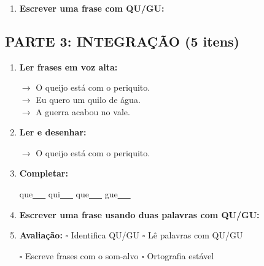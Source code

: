 \begin{exercicio}
\begin{enumerate}[resume]
  \item \textbf{Escrever uma frase com QU/GU:}
  \begin{center}
  \underline{\hspace{12cm}}
  \end{center}

\end{enumerate}

\subsection*{PARTE 3: INTEGRAÇÃO (5 itens)}

\begin{enumerate}[resume]

  \item \textbf{Ler frases em voz alta:}
  \begin{center}
  $\rightarrow$ O queijo está com o periquito.\\
  $\rightarrow$ Eu quero um quilo de água.\\
  $\rightarrow$ A guerra acabou no vale.\\
  \end{center}

  \item \textbf{Ler e desenhar:}
  \begin{center}
  $\rightarrow$ O queijo está com o periquito.
  \end{center}
  \begin{center}
  \end{center}

  \item \textbf{Completar:}
  \begin{center}
  que\underline{~~~} \quad qui\underline{~~~} \quad que\underline{~~~} \quad gue\underline{~~~}
  \end{center}

  \item \textbf{Escrever uma frase usando duas palavras com QU/GU:}
  \begin{center}
  \underline{\hspace{12cm}}
  \end{center}

  \item \textbf{Avaliação:} $\square$ Identifica QU/GU \quad $\square$ Lê palavras com QU/GU
  \begin{center}
  $\square$ Escreve frases com o som-alvo \quad $\square$ Ortografia estável
  \end{center}


\end{enumerate}
\end{exercicio}
